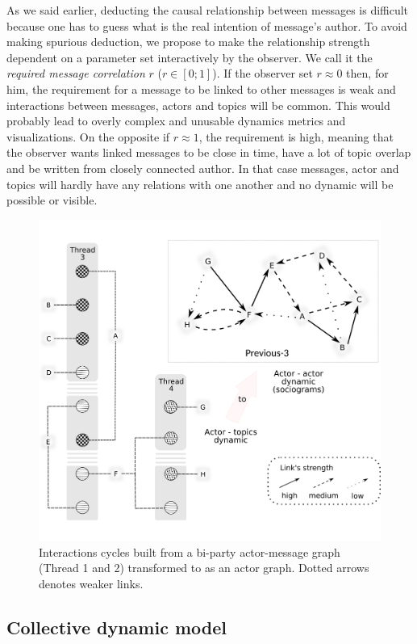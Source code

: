 \documentclass[a4paper,twoside]{article}
\begin{document}
As we said earlier, deducting the causal relationship between messages is difficult because one has to guess what is the real intention of message's author.  To avoid making spurious deduction, we propose to make the relationship strength dependent on a parameter set interactively by the observer.  We call it the \emph{required message correlation} $r$ ($r\in[0;1]$).  If the observer set $r \approx 0$ then, for him, the requirement for a message to be linked to other messages is weak and interactions between messages, actors and topics will be common.  This would probably lead to  overly complex and unusable dynamics metrics and visualizations.  On the opposite if $r\approx 1$, the requirement is high, meaning that the observer wants linked messages to be close in time, have a lot of topic overlap and be written from closely connected author.  In that case messages, actor and topics will hardly have any relations with one another and no dynamic will be possible or visible.

\begin{figure}[t]
  \centering
  \includegraphics[width=.5\textwidth]{images/cycles.png}
  \small{
    \caption{\label{fig:cycles}
      Interactions cycles built from a bi-party actor-message graph  (Thread 1 and 2) transformed  to as an actor graph.  Dotted arrows denotes weaker links.
    }}
\end{figure}
 

\subsection{Collective dynamic model}
\end{document}
